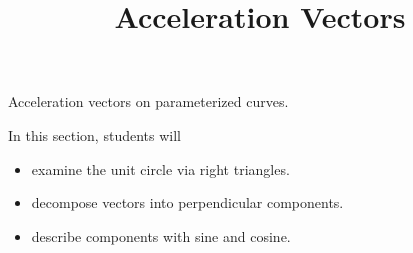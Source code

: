 \documentclass{ximera}
\title{Acceleration Vectors}
\begin{document}
\begin{abstract}
\end{abstract}
\maketitle




Acceleration vectors on parameterized curves.







\begin{sectionOutcomes}
In this section, students will 

\begin{itemize}
\item examine the unit circle via right triangles.
\item decompose vectors into perpendicular components.
\item describe components with sine and cosine.
\end{itemize}
\end{sectionOutcomes}
\end{document}

